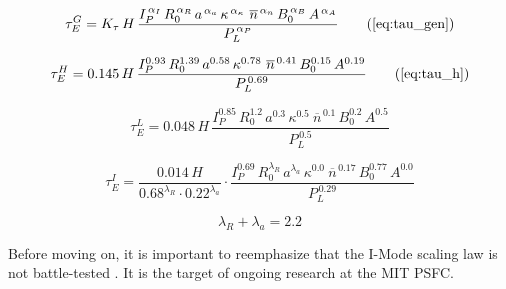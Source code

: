 \begin{equation}
  \tau_E^G = K_\tau \, H \, \frac{
    I_P^{\,\alpha_I} \, R_0^{\,\alpha_R} \, a^{\,\alpha_a} \, \kappa^{\,\alpha_\kappa} \ \overline{n}^{\,\alpha_n} \, B_0^{\,\alpha_B} \, A^{\,\alpha_A}
  }{ P_L ^ {\,\alpha_P} }
  \tag{\ref{eq:tau_gen}}
\end{equation}

\begin{equation}
  \tau_E^H = 0.145 \, H \, \frac{
    I_P^{0.93} \, R_0^{1.39} \, a^{0.58} \, \kappa^{0.78} \ \overline{n}^{\, 0.41} \, B_0^{0.15} \, A^{0.19}
  }{ P_L ^ {\,0.69} }
  \tag{\ref{eq:tau_h}}
\end{equation}

\begin{equation}
  \tau_E^L = 0.048\, H \, \frac{
    I_P^{0.85} \, R_0^{1.2} \, a^{0.3} \, \kappa^{0.5} \ \overline{n}^{\, 0.1} \, B_0^{0.2} \, A^{0.5} }{ P_L ^ {\,0.5} }
\end{equation}

\begin{equation}
  \tau_E^I = \frac{ 0.014 \, H }{ 0.68 ^ {\lambda_R} \cdot 0.22 ^ {\lambda_a} } \cdot \frac{ I_P^{0.69} \, R_0^{\lambda_R} \, a^{\lambda_a} \, \kappa^{0.0} \ \overline{n}^{\, 0.17} \, B_0^{0.77} \, A^{0.0} }{ P_L ^ {\,0.29} }
\end{equation}

\begin{equation}
	\lambda_R + \lambda_a = 2.2
\end{equation}

Before moving on, it is important to reemphasize that the I-Mode scaling law is not battle-tested . It is the target of ongoing research at the MIT PSFC.


%
